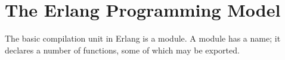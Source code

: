 \section{The Erlang Programming Model}

The basic compilation unit in Erlang is a module. A module has a name;
it declares a number of functions, some of which may be exported.
